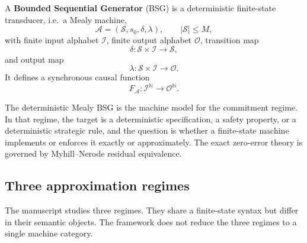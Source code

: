 \documentclass[12pt]{article}
\theoremstyle{definition}
\begin{document}
A \textbf{Bounded Sequential Generator} (BSG) is a deterministic finite-state
transducer, i.e.\ a Mealy machine,
\[
\mathcal A=(\mathcal S,s_0,\delta,\lambda),
\qquad
|\mathcal S|\le M,
\]
with finite input alphabet $\mathcal I$, finite output alphabet $\mathcal O$,
transition map
\[
\delta:\mathcal S\times\mathcal I\to\mathcal S,
\]
and output map
\[
\lambda:\mathcal S\times\mathcal I\to\mathcal O.
\]
It defines a synchronous causal function
\[
F_{\mathcal A}:\mathcal I^{\mathbb N}\to\mathcal O^{\mathbb N}.
\]

The deterministic Mealy BSG is the machine model for the commitment regime.
In that regime, the target is a deterministic specification, a safety
property, or a deterministic strategic rule, and the question is whether a
finite-state machine implements or enforces it exactly or approximately.  The
exact zero-error theory is governed by Myhill--Nerode residual equivalence.

\subsection{Three approximation regimes}
\label{subsec:three-regimes}

The manuscript studies three regimes.  They share a finite-state syntax but
differ in their semantic objects.  The framework does not reduce the three
regimes to a single machine category.
\end{document}
